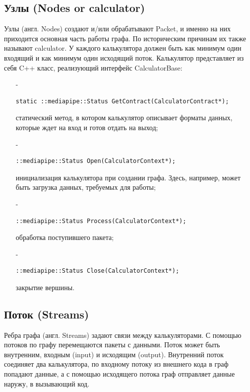 \documentclass[a4paper,14pt]{extreport}
\begin{document}
        \subsection{Узлы (Nodes or calculator)}
        Узлы (англ. Nodes) создают и/или обрабатывают Packet, и именно на них приходится основная часть работы графа. По историческим причинам их также называют calculator. У каждого калькулятора должен быть как минимум один входящий и как минимум один исходящий поток. Калькулятор представляет из себя C++ класс, реализующий интерфейс CalculatorBase:
        \begin{itemize}
          \item[-] \begin{verbatim}static ::mediapipe::Status GetContract(CalculatorContract*);\end{verbatim} статический метод, в котором калькулятор описывает форматы данных, которые ждет на вход и готов отдать на выход;
          
          \item[-] \begin{verbatim}::mediapipe::Status Open(CalculatorContext*);\end{verbatim} инициализация калькулятора при создании графа. Здесь, например, может быть загрузка данных, требуемых для работы;
          
          \item[-] \begin{verbatim}::mediapipe::Status Process(CalculatorContext*);\end{verbatim} обработка поступившего пакета;
          
          \item[-] \begin{verbatim}::mediapipe::Status Close(CalculatorContext*);\end{verbatim} 
           закрытие вершины.
        \end{itemize}
        
        \subsection{Поток (Streams)}
        Ребра графа (англ. Streams) задают связи между калькуляторами. С помощью потоков по графу перемещаются пакеты с данными. Поток может быть внутренним, входным (input) и исходящим (output). Внутренний поток соединяет два калькулятора, по входному потоку из внешнего кода в граф попадают данные, а с помощью исходящего потока граф отправляет данные наружу, в вызывающий код.
\end{document}
